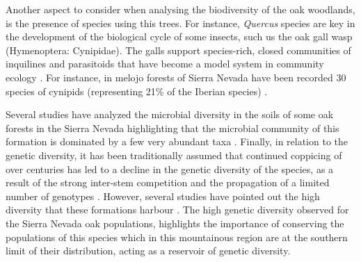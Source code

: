 Another aspect to consider when analysing the biodiversity of the oak woodlands, is the presence of species using this trees. For instance, \emph{Quercus} species are key in the development of the biological cycle of some insects, such us the oak gall wasp (Hymenoptera: Cynipidae). The galls support species-rich, closed communities of inquilines and parasitoids that have become a model system in community ecology \autocites{Stoneetal2002PopulationBiology}. For instance, in melojo forests of Sierra Nevada have been recorded 30 species of cynipids (representing 21\% of the Iberian species) \autocites{NievesAldrey2013AvispasAgallas}. 

Several studies have analyzed the microbial diversity in the soils of some oak forests in the Sierra Nevada highlighting that the microbial community of this formation is dominated by a few very abundant taxa \autocites{CoboDiazetal2017TaxonomicFunctional,Lasaetal2019BacteriaEndosphere, Lasaetal2019MetabarcodingReveals}. Finally, in relation to the genetic diversity, it has been traditionally assumed that continued coppicing of \Qp over centuries has led to a decline in the genetic diversity of the species, as a result of the strong inter-stem competition and the propagation of a limited number of genotypes 
\autocites{SanchezPalomaresetal2008EstacionesEcologicas,Bravoetal2008SelviculturaMontes}. However, several studies have pointed out the high diversity that these formations harbour \autocites{ValbuenaCarabanaGil2013GeneticResilience,ValbuenaCarabanaGil2013ReduceAprovechamiento,ValbuenaCarabanaGil2014EfectosGestion,ValbuenaCarabanaGil2017CentenaryCoppicing}. The high genetic diversity observed for the Sierra Nevada oak populations, highlights the importance of conserving the populations of this species which in this mountainous region are at the southern limit of their distribution, acting as a reservoir of genetic diversity. 

